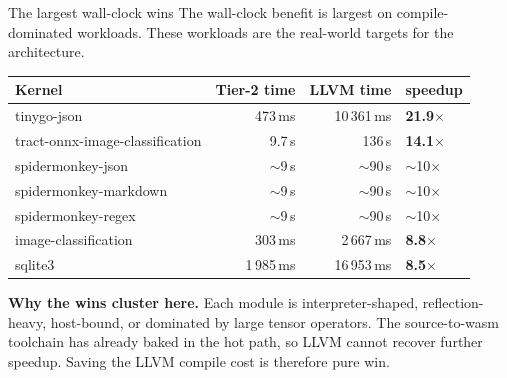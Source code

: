 \documentclass[aspectratio=169,11pt]{beamer}
\newcommand{\ttwo}{\textbf{\textcolor{tier2}{Tier-2}}}
\newcommand{\code}[1]{{\ttfamily\small #1}}
\begin{document}
\begin{frame}{The largest wall-clock wins}
  The wall-clock benefit is largest on compile-dominated workloads.
  These workloads are the real-world targets for the architecture.

  \vspace{0.4em}
  \centering
  \small
  \begin{tabular}{lrrl}
    \toprule
    Kernel & \ttwo{} time & LLVM time & speedup \\
    \midrule
    \code{tinygo-json}                     & 473\,ms   & 10\,361\,ms & \textbf{21.9$\times$} \\
    \code{tract-onnx-image-classification} & 9.7\,s    & 136\,s      & \textbf{14.1$\times$} \\
    \code{spidermonkey-json}               & $\sim$9\,s & $\sim$90\,s & $\sim$10$\times$ \\
    \code{spidermonkey-markdown}           & $\sim$9\,s & $\sim$90\,s & $\sim$10$\times$ \\
    \code{spidermonkey-regex}              & $\sim$9\,s & $\sim$90\,s & $\sim$10$\times$ \\
    \code{image-classification}            & 303\,ms   & 2\,667\,ms  & \textbf{8.8$\times$}  \\
    \code{sqlite3}                         & 1\,985\,ms & 16\,953\,ms & \textbf{8.5$\times$}  \\
    \bottomrule
  \end{tabular}

  \vspace{0.4em}
  \scriptsize
  \textbf{Why the wins cluster here.}
  Each module is interpreter-shaped, reflection-heavy, host-bound, or dominated by large tensor operators.
  The source-to-wasm toolchain has already baked in the hot path, so LLVM cannot recover further speedup.
  Saving the LLVM compile cost is therefore pure win.
\end{frame}
\end{document}
